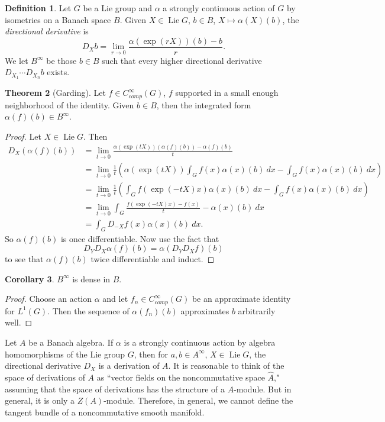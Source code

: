 \documentclass[12pt]{report}
\newcommand{\Lie}{\operatorname{Lie}}
\newcommand{\dfn}[1]{\emph{#1}\index{#1}}
\theoremstyle{definition}
\newtheorem{theorem}{Theorem}[chapter]
\newtheorem{corollary}[theorem]{Corollary}
\newtheorem{definition}[theorem]{Definition}
\begin{document}
\begin{definition}
    Let $G$ be a Lie group and $\alpha$ a strongly continuous action of $G$ by isometries on a Banach space $B$. Given $X \in \Lie G$, $b \in B$, $X \mapsto \alpha(X)(b)$, the \dfn{directional derivative} is
    $$D_Xb = \lim_{r \to 0} \frac{\alpha(\exp(rX))(b) - b}{r}.$$
    We let $B^\infty$ be those $b \in B$ such that every higher directional derivative $D_{X_1} \cdots D_{X_n} b$ exists.
\end{definition}
\begin{theorem}[Garding]
    Let $f \in C^\infty_{comp}(G)$, $f$ supported in a small enough neighborhood of the identity. Given $b \in B$, then the integrated form $\alpha(f)(b) \in B^\infty$.
\end{theorem}
\begin{proof}
    Let $X \in \Lie G$. Then
\begin{align*}D_X(\alpha(f)(b)) &= \lim_{t \to 0} \frac{\alpha(\exp(tX))(\alpha(f)(b)) - \alpha(f)(b)}{t} \\
    &= \lim_{t \to 0} \frac{1}{t}\left(\alpha(\exp(tX))\int_G f(x)\alpha(x)(b) ~dx - \int_G f(x)\alpha(x)(b) ~dx \right)\\
    &= \lim_{t \to 0} \frac{1}{t}\left(\int_G f(\exp(-tX)x) \alpha(x)(b) ~dx - \int_G f(x) \alpha(x)(b) ~dx\right)\\
    &= \lim_{t \to 0} \int_G \frac{f(\exp(-tX)x) - f(x)}{t} - \alpha(x)(b) ~dx\\
    &= \int_G D_{-X}f(x)\alpha(x)(b) ~dx.
    \end{align*}
    So $\alpha(f)(b)$ is once differentiable. Now use the fact that
    $$D_YD_X\alpha(f)(b) = \alpha(D_YD_Xf)(b)$$
    to see that $\alpha(f)(b)$ twice differentiable and induct.
\end{proof}
\begin{corollary}
    $B^\infty$ is dense in $B$.
\end{corollary}
\begin{proof}
    Choose an action $\alpha$ and let $f_n \in C^\infty_{comp}(G)$ be an approximate identity for $L^1(G)$. Then the sequence of $\alpha(f_n)(b)$ approximates $b$ arbitrarily well.
\end{proof}
    Let $A$ be a Banach algebra. If $\alpha$ is a strongly continuous action by algebra homomorphisms of the Lie group $G$, then for $a,b \in A^\infty$, $X \in \Lie G$, the directional derivative $D_X$ is a derivation of $A$. It is reasonable to think of the space of derivations of $A$ as ``vector fields on the noncommutative space $\hat A$," assuming that the space of derivations has the structure of a $A$-module. But in general, it is only a $Z(A)$-module. Therefore, in general, we cannot define the tangent bundle of a noncommutative smooth manifold.
\end{document}
